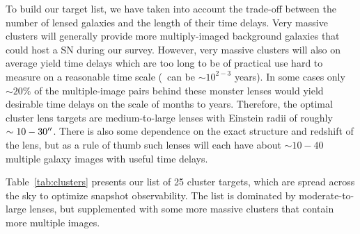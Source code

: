To build our target list, we have taken into account the trade-off
between the number of lensed galaxies and the length of their time
delays.  Very massive clusters will generally provide more
multiply-imaged background galaxies that could host a SN during our
survey.  However, very massive clusters will also on average yield
time delays which are too long to be of practical use hard to measure
on a reasonable time scale (\dt~can be $\sim10^{2-3}$ years). In some
cases only $\sim20\%$ of the multiple-image pairs behind these
monster lenses would yield desirable time delays on the scale of
months to years.  Therefore, the optimal cluster lens targets are
medium-to-large lenses with Einstein radii of roughly
$\sim10-30^{\prime\prime}$.  There is also some dependence on the exact
structure and redshift of the lens, but as a rule of thumb such lenses
will each have about $\sim10-40$ multiple galaxy images with useful time
delays.

Table~\ref{tab:clusters} presents our list of 25 cluster targets,
which are spread across the sky to optimize snapshot
observability. The list is dominated by moderate-to-large lenses, but
supplemented with some more massive clusters that contain more
multiple images.
